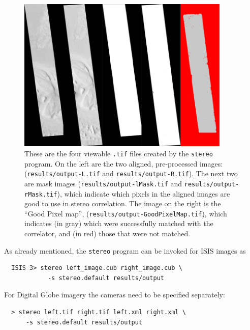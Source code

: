 \begin{figure}[t!]
\begin{minipage}{4in}
\includegraphics[width=4in]{images/p19-stereo-output_400px.png}
\end{minipage}
\hfill
\begin{minipage}{2.9in}
\caption[P19 stereo output images]{
    \label{p19-stereo-output}
        These are the four viewable \texttt{.tif} files created by the
        \texttt{stereo} program.  On the left are the two aligned,
        pre-processed images: (\texttt{results/output-L.tif} and
        \texttt{results/output-R.tif}).  The next two are mask images
        (\texttt{results/output-lMask.tif} and
        \texttt{results/output-rMask.tif}), which indicate which
        pixels in the aligned images are good to use in stereo
        correlation.  The image on the right is the ``Good Pixel
        map'', (\texttt{results/output-GoodPixelMap.tif}), which
        indicates (in gray) which were successfully matched with the
        correlator, and (in red) those that were not matched.}
\end{minipage}
\end{figure}

As already mentioned, the \texttt{stereo} program can be invoked for ISIS
images as

\begin{verbatim}
  ISIS 3> stereo left_image.cub right_image.cub \
            -s stereo.default results/output
\end{verbatim}

For Digital Globe imagery the cameras need to be specified separately:


\begin{verbatim}
  > stereo left.tif right.tif left.xml right.xml \
      -s stereo.default results/output
\end{verbatim}

